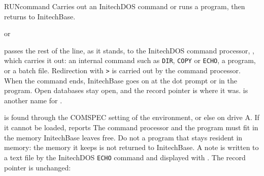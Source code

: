 \begin{XbaseEntry}{RUN}{command}\XAlso{!}{!}%
Carries out an InitechDOS command or runs a program, then returns to
InitechBase.
\Syntax
{}
\par or\par
{}
\Usage
{} passes the rest of the line, as it stands, to the InitechDOS
command processor, , which carries it out: an internal
command such as \texttt{DIR}, \texttt{COPY} or \texttt{ECHO}, a program, or a
batch file.  Redirection with \texttt{>} is carried out by the command
processor.  When the command ends, InitechBase goes on at the dot prompt or
in the program.  Open databases stay open, and the record pointer is where it
was.  \cmd{!} is another name for .

 is found through the COMSPEC setting of the environment,
or else on drive A.  If it cannot be loaded,  reports
  The command processor and the
program must fit in the memory InitechBase leaves free.
\Tips
Do not  a program that stays resident in memory: the memory it keeps
is not returned to InitechBase.
\Examples
A note is written to a text file by the InitechDOS \texttt{ECHO} command and
displayed with .  The record pointer is unchanged:
\end{XbaseEntry}
